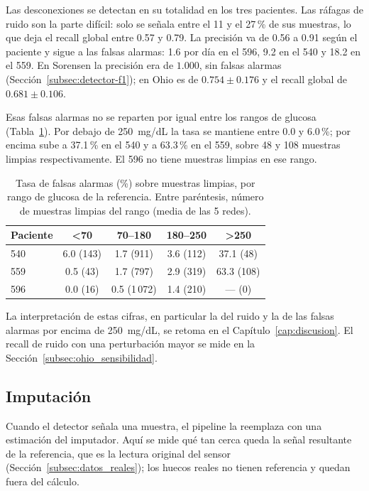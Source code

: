 \documentclass{report}
\begin{document}
Las desconexiones se detectan en su totalidad en los tres pacientes. Las ráfagas de ruido son la parte difícil: solo se señala entre el 11 y el 27\,\% de sus muestras, lo que deja el recall global entre 0.57 y 0.79. La precisión va de 0.56 a 0.91 según el paciente y sigue a las falsas alarmas: 1.6 por día en el 596, 9.2 en el 540 y 18.2 en el 559. En Sorensen la precisión era de $1.000$, sin falsas alarmas (Sección~\ref{subsec:detector-f1}); en Ohio es de $0.754 \pm 0.176$ y el recall global de $0.681 \pm 0.106$.
 
Esas falsas alarmas no se reparten por igual entre los rangos de glucosa (Tabla~\ref{tab:ohio_fpr_rangos}). Por debajo de 250~mg/dL la tasa se mantiene entre 0.0 y 6.0\,\%; por encima sube a 37.1\,\% en el 540 y a 63.3\,\% en el 559, sobre 48 y 108 muestras limpias respectivamente. El 596 no tiene muestras limpias en ese rango.
 
\begin{table}[H]
\centering
\footnotesize
\caption{Tasa de falsas alarmas (\%) sobre muestras limpias, por rango de glucosa de la referencia. Entre paréntesis, número de muestras limpias del rango (media de las 5 redes).}
\label{tab:ohio_fpr_rangos}
\begin{tabular}{lcccc}
\toprule
\textbf{Paciente} & \textbf{<70} & \textbf{70--180} & \textbf{180--250} & \textbf{>250} \\
\midrule
540 & 6.0 (143) & 1.7 (911) & 3.6 (112) & 37.1 (48) \\
559 & 0.5 (43)  & 1.7 (797) & 2.9 (319) & 63.3 (108) \\
596 & 0.0 (16)  & 0.5 (1\,072) & 1.4 (210) & --- (0) \\
\bottomrule
\end{tabular}
\end{table}
 
La interpretación de estas cifras, en particular la del ruido y la de las falsas alarmas por encima de 250~mg/dL, se retoma en el Capítulo~\ref{cap:discusion}. El recall de ruido con una perturbación mayor se mide en la Sección~\ref{subsec:ohio_sensibilidad}.

\subsection{Imputación}
\label{subsec:ohio_imputacion}
 
Cuando el detector señala una muestra, el pipeline la reemplaza con una estimación del imputador. Aquí se mide qué tan cerca queda la señal resultante de la referencia, que es la lectura original del sensor (Sección~\ref{subsec:datos_reales}); los huecos reales no tienen referencia y quedan fuera del cálculo.
 
\end{document}

